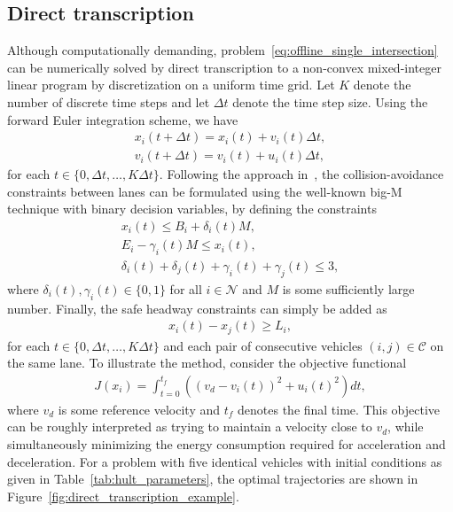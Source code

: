 \documentclass[a4paper]{article}
\theoremstyle{definition}
\theoremstyle{plain}
\begin{document}
\subsection{Direct transcription}

Although computationally demanding,
problem~\eqref{eq:offline_single_intersection} can be numerically solved by
direct transcription to a non-convex mixed-integer linear program by
discretization on a uniform time grid. Let $K$ denote the number of discrete
time steps and let $\Delta t$ denote the time step size.
%
Using the forward Euler integration scheme, we have
\begin{align*}
  x_{i}(t + \Delta t) = x_{i}(t) + v_{i}(t) \Delta t , \\
  v_{i}(t + \Delta t) = v_{i}(t) + u_{i}(t) \Delta t ,
\end{align*}
for each $t \in \{0, \Delta t, \dots, K \Delta t\}$. Following the approach in~\cite{hultApproximateSolutionOptimal2015}, the
collision-avoidance constraints between lanes can be formulated using the
well-known big-M technique with binary decision variables, by defining the
constraints
\begin{align*}
  x_{i}(t) \leq B_{i} + \delta_{i}(t) M , \\
  E_{i} - \gamma_{i}(t) M \leq x_{i}(t) , \\
  \delta_{i}(t) + \delta_{j}(t) + \gamma_{i}(t) + \gamma_{j}(t) \leq 3 ,
\end{align*}
where $\delta_{i}(t), \gamma_{i}(t) \in \{ 0, 1 \}$ for all $i \in \mathcal{N}$ and $M$ is some
sufficiently large number.
%
Finally, the safe headway constraints can simply be added as
\begin{align*}
  x_{i}(t) - x_{j}(t) \geq L_{i} ,
\end{align*}
for each $t \in \{0, \Delta t, \dots, K \Delta t\}$ and each pair of consecutive
vehicles $(i, j) \in \mathcal{C}$ on the same lane.
%
To illustrate the method, consider the objective functional
\begin{align*}
  J(x_{i}) = \int_{t=0}^{t_{f}} \left( {(v_{d} - v_{i}(t))}^{2} + {u_{i}(t)}^{2} \right) dt ,
\end{align*}
where $v_{d}$ is some reference velocity and $t_{f}$ denotes the final time.
This objective can be roughly interpreted as trying to maintain a velocity close
to $v_{d}$, while simultaneously minimizing the energy consumption required for
acceleration and deceleration. For a problem with five identical vehicles with
initial conditions as given in Table~\ref{tab:hult_parameters}, the optimal
trajectories are shown in Figure~\ref{fig:direct_transcription_example}.
\end{document}
